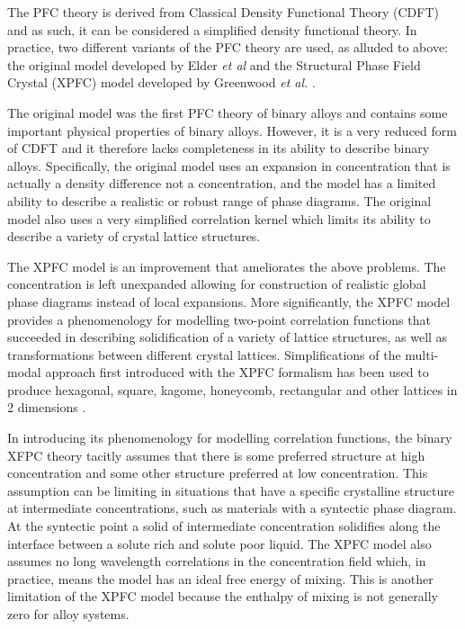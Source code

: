 \documentclass[showkeys, prb, reprint]{revtex4-1}
\begin{document}
The PFC theory is derived from Classical Density Functional Theory (CDFT) and
as such, it can be considered a simplified density functional theory.  In
practice, two different variants of the PFC theory are used, as alluded to
above: the original model developed by Elder \textit{et al} \cite{ELDER07} and
the Structural Phase Field Crystal (XPFC) model developed by Greenwood
\textit{et al.} \cite{GREENWOOD11_BINARY}.

The original model was the first PFC theory of binary alloys and contains some
important physical properties of binary alloys. However, it is a very reduced
form of CDFT and it therefore lacks completeness in its ability to describe
binary alloys. Specifically, the original model uses an expansion in
concentration that is actually a density difference not a concentration, and
the model has a limited ability to describe a realistic or robust range of
phase diagrams. The original model also uses a very simplified correlation
kernel which limits its ability to describe a variety of crystal lattice
structures.

The XPFC model is an improvement that ameliorates the above problems. The
concentration is left unexpanded allowing for construction of realistic global
phase diagrams instead of local expansions. More significantly, the XPFC model
provides a phenomenology for modelling two-point correlation functions that
succeeded in describing solidification of a variety of lattice structures, as
well as transformations between different crystal lattices. Simplifications of
the multi-modal approach first introduced with the XPFC formalism has been used
to produce hexagonal, square, kagome, honeycomb, rectangular and other lattices
in 2 dimensions \cite{MKHONTA13}.


In introducing its phenomenology for modelling correlation functions, the
binary XFPC theory tacitly assumes that there is some preferred structure at
high concentration and some other structure preferred at low concentration.
This assumption can be limiting in situations that have a specific crystalline
structure at intermediate concentrations, such as materials with a syntectic
phase diagram. At the syntectic point a solid of intermediate concentration
solidifies along the interface between a solute rich and solute poor liquid.
The XPFC model also assumes no long wavelength correlations in the
concentration field which, in practice, means the model has an ideal free
energy of mixing.  This is another limitation of the XPFC model because the
enthalpy of mixing is not generally zero for alloy systems.
\end{document}

